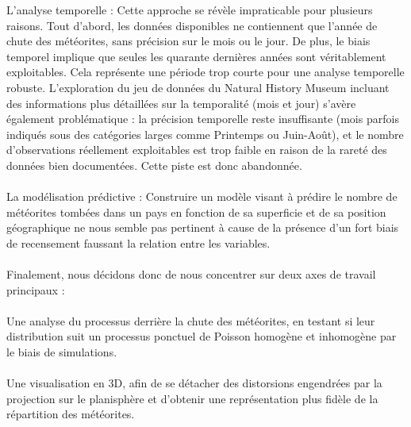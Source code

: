 \documentclass[12pt]{article}
\begin{document}
 L'analyse temporelle : Cette approche se révèle impraticable pour plusieurs raisons. Tout d’abord, les données disponibles ne contiennent que l’année de chute des météorites, sans précision sur le mois ou le jour. De plus, le biais temporel implique que seules les quarante dernières années sont véritablement exploitables. Cela représente une période trop courte pour une analyse temporelle robuste. L'exploration du jeu de données du Natural History Museum \cite{MetCat} incluant des informations plus détaillées sur la temporalité (mois et jour) s'avère également problématique : la précision temporelle reste insuffisante (mois parfois indiqués sous des catégories larges comme Printemps ou Juin-Août), et le nombre d’observations réellement exploitables est trop faible en raison de la rareté des données bien documentées. Cette piste est donc abandonnée.\\
\\
La modélisation prédictive : Construire un modèle visant à prédire le nombre de météorites tombées dans un pays en fonction de sa superficie et de sa position géographique ne nous semble pas pertinent à cause de la présence d’un fort biais de recensement faussant la relation entre les variables.\\
\\
Finalement, nous décidons donc de nous concentrer sur deux axes de travail principaux :\\
\\
Une analyse du processus derrière la chute des météorites, en testant si leur distribution suit un processus ponctuel de Poisson homogène et inhomogène par le biais de simulations.\\
\\
Une visualisation en 3D, afin de se détacher des distorsions engendrées par la projection sur le planisphère et d’obtenir une représentation plus fidèle de la répartition des météorites.\\
\end{document}
